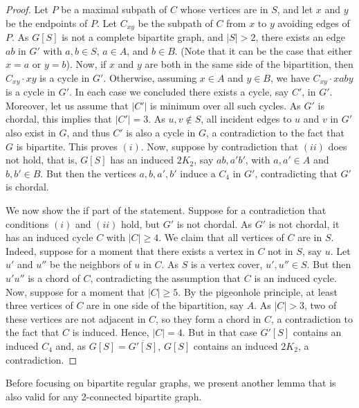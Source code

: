 \documentclass[11pt]{article}
\theoremstyle{definition}
\begin{document}
\begin{proof}
Let $P$ be a maximal subpath of $C$ whose vertices are in $S$, and let $x$ and $y$ be the endpoints of $P$. Let $C_{xy}$ be the subpath of $C$ from $x$ to $y$ avoiding edges of $P$.
As $G[S]$ is not a complete bipartite graph, and $|S|>2$, there exists an edge $ab$ in $G'$ with $a,b \in S$, $a\in A$,
and $b \in B$.
(Note that it can be the case that either $x=a$ or $y=b$).
Now, if $x$ and $y$ are both in the same side of the bipartition, then
$C_{xy} \cdot xy$ is a cycle in $G'$. Otherwise, assuming
$x \in A$ and $y \in B$, we have $C_{xy} \cdot xaby$
is a cycle in $G'$.
In each case we concluded there exists a cycle, say $C'$, in $G'$.
Moreover, let us assume that $|C'|$ is minimum over all such cycles. 
As $G'$ is chordal, this implies that $|C'|=3$.
As $u,v \notin S$, all incident edges to $u$ and $v$
in $G'$ also exist in $G$, and thus $C'$ is also a cycle in $G$, a contradiction to the fact that $G$ is bipartite. This proves $(i)$.
Now, suppose by contradiction that $(ii)$ does not hold, that is, $G[S]$ has an induced $2K_2$, say $ab, a'b'$, with $a,a' \in A$ and $b,b' \in B$.
But then the vertices $a,b,a',b'$ induce a $C_4$ in $G'$, contradicting
that $G'$ is chordal.

We now show the if part of the statement.
Suppose for a contradiction that conditions $(i)$ and $(ii)$ hold, but $G'$ is not chordal.
As $G'$ is not chordal, it has an induced cycle $C$ with $|C| \geq 4$.
We claim that all vertices of $C$ are in $S$.
Indeed, suppose for a moment that there exists a vertex in $C$ not in $S$, say $u$.
Let $u'$ and $u''$ be the neighbors of $u$ in $C$.
As $S$ is a vertex cover, $u',u'' \in S$.
But then $u'u''$ is a chord of $C$, contradicting the assumption that $C$
is an induced cycle.
Now, suppose for a moment that $|C| \geq 5$.
By the pigeonhole principle, at least three vertices of $C$
are in one side of the bipartition, say $A$.
As $|C|>3$, two of these vertices are not adjacent in $C$, so they form a chord in $C$, a contradiction to the fact that $C$ is induced.
Hence, $|C| = 4$. But in that case 
$G'[S]$ contains an induced $C_4$ and,
as $G[S] = \overline{G'[S]}$,
$G[S]$ contains an induced $2K_2$, a contradiction.
\end{proof}

Before focusing on bipartite regular graphs,
we present another lemma that is also valid for any 2-connected bipartite graph.
\end{document}
